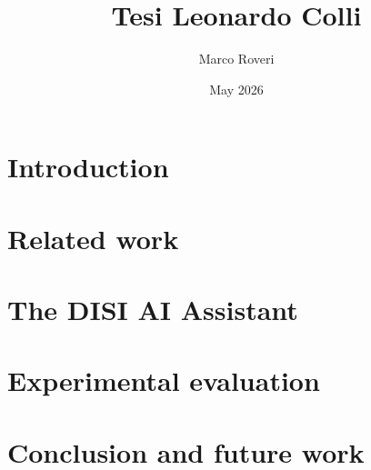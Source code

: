 \documentclass{article}
\title{Tesi Leonardo Colli}
\author{Marco Roveri}
\date{May 2026}
\begin{document}
\maketitle

\section{Introduction}

\section{Related work}

\section{The DISI AI Assistant}

\section{Experimental evaluation}

\section{Conclusion and future work}
\end{document}
